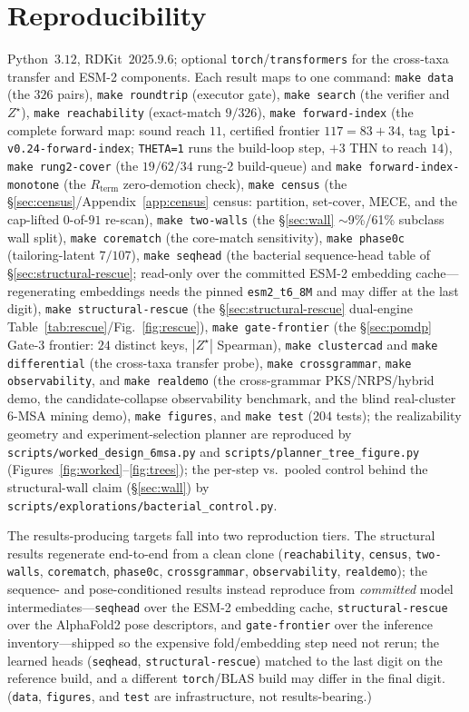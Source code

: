 \documentclass[11pt]{article}
\theoremstyle{definition}
\newcommand{\zstar}{\ensuremath{Z^{\star}}}
\newcommand{\code}[1]{\texttt{#1}}
\begin{document}
\section{Reproducibility}
\label{app:repro}
\small\sloppy
Python~$3.12$, RDKit~$2025.9.6$; optional \texttt{torch}/\texttt{transformers} for the
cross-taxa transfer and ESM-2 components. Each result maps to one command:
\code{make data} (the $326$ pairs), \code{make roundtrip} (executor gate),
\code{make search} (the verifier and \zstar{}), \code{make reachability} (exact-match $9/326$),
\code{make forward-index} (the complete forward map: sound reach $11$, certified frontier $117{=}83{+}34$, tag \texttt{lpi-v0.24-forward-index}; \code{THETA=1} runs the build-loop step, $+3$ THN to reach $14$),
\code{make rung2-cover} (the $19/62/34$ rung-2 build-queue) and \code{make forward-index-monotone} (the $R_{\mathrm{term}}$ zero-demotion check),
\code{make census} (the \S\ref{sec:census}/Appendix~\ref{app:census} census: partition, set-cover,
MECE, and the cap-lifted $0$-of-$91$ re-scan), \code{make two-walls} (the \S\ref{sec:wall}
$\sim$9\%/61\% subclass wall split),
\code{make corematch} (the core-match sensitivity), \code{make phase0c} (tailoring-latent
$7/107$), \code{make seqhead} (the bacterial sequence-head table of \S\ref{sec:structural-rescue};
read-only over the committed ESM-2 embedding cache---regenerating embeddings needs the pinned
\texttt{esm2\_t6\_8M} and may differ at the last digit),
\code{make structural-rescue} (the \S\ref{sec:structural-rescue} dual-engine
Table~\ref{tab:rescue}/Fig.~\ref{fig:rescue}), \code{make gate-frontier} (the \S\ref{sec:pomdp}
Gate-3 frontier: $24$ distinct keys, $|\zstar|$ Spearman), \code{make clustercad} and
\code{make differential} (the cross-taxa transfer probe),
\code{make crossgrammar}, \code{make observability}, and \code{make realdemo} (the cross-grammar
PKS/NRPS/hybrid demo, the candidate-collapse observability benchmark, and the blind real-cluster
6-MSA mining demo), \code{make figures}, and \code{make test} ($204$ tests); the realizability
geometry and experiment-selection planner are reproduced by \code{scripts/worked\_design\_6msa.py}
and \code{scripts/planner\_tree\_figure.py} (Figures~\ref{fig:worked}--\ref{fig:trees}); the per-step
vs.\ pooled control behind the structural-wall claim (\S\ref{sec:wall}) by
\code{scripts/explorations/bacterial\_control.py}.

The results-producing targets fall into two reproduction tiers. The structural results regenerate
end-to-end from a clean clone (\code{reachability}, \code{census}, \code{two-walls}, \code{corematch},
\code{phase0c}, \code{crossgrammar}, \code{observability}, \code{realdemo}); the sequence- and
pose-conditioned results instead reproduce from \emph{committed} model intermediates---\code{seqhead}
over the ESM-2 embedding cache, \code{structural-rescue} over the AlphaFold2 pose descriptors, and
\code{gate-frontier} over the inference inventory---shipped so the expensive fold/embedding step need
not rerun; the learned heads (\code{seqhead}, \code{structural-rescue}) matched to the last digit on the
reference build, and a different \texttt{torch}/BLAS build may differ in the final digit. (\code{data},
\code{figures}, and \code{test} are infrastructure, not results-bearing.)
\end{document}
